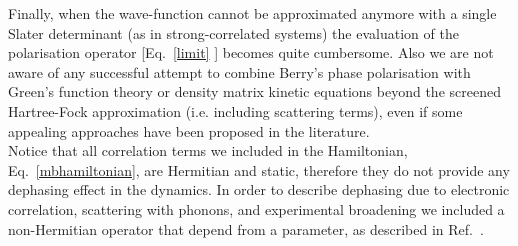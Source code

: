Finally, when the wave-function cannot be approximated anymore with a single Slater determinant (as in strong-correlated systems) the evaluation of the polarisation operator [Eq.~\ref{limit} ] becomes quite cumbersome.\cite{stella} Also we are not aware of any successful attempt to combine Berry's phase polarisation with Green's function theory or density matrix kinetic equations beyond the screened Hartree-Fock approximation (i.e. including scattering terms), even if some appealing approaches have been proposed in the literature\cite{restagw,PhysRevB.84.205137,doi:10.7566/JPSJ.83.033708,nourafkan2013electric}.\\
Notice that all correlation terms we included in the Hamiltonian, Eq.~\ref{mbhamiltonian}, are Hermitian and static, therefore they do not provide any dephasing effect in the dynamics. In order to describe dephasing due to electronic correlation, scattering with phonons, and experimental broadening we included a non-Hermitian operator that depend from a parameter, as described in Ref.~.
